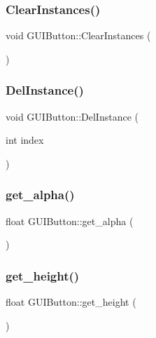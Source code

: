 \hypertarget{class_g_u_i_button_ad0f6147ba79ce14840ed061e25ca7e40}{}\label{class_g_u_i_button_ad0f6147ba79ce14840ed061e25ca7e40} 
\subsubsection{\texorpdfstring{Clear\+Instances()}{ClearInstances()}}
{\footnotesize\ttfamily void G\+U\+I\+Button\+::\+Clear\+Instances (\begin{DoxyParamCaption}{ }\end{DoxyParamCaption})}

\hypertarget{class_g_u_i_button_a8a59c9135d1533ce03f1c56c2240725f}{}\label{class_g_u_i_button_a8a59c9135d1533ce03f1c56c2240725f} 
\subsubsection{\texorpdfstring{Del\+Instance()}{DelInstance()}}
{\footnotesize\ttfamily void G\+U\+I\+Button\+::\+Del\+Instance (\begin{DoxyParamCaption}\item[{int}]{index }\end{DoxyParamCaption})}

\hypertarget{class_g_u_i_button_a9c3c65fb8afee7e4da6283d27791f694}{}\label{class_g_u_i_button_a9c3c65fb8afee7e4da6283d27791f694} 
\subsubsection{\texorpdfstring{get\+\_\+alpha()}{get\_alpha()}}
{\footnotesize\ttfamily float G\+U\+I\+Button\+::get\+\_\+alpha (\begin{DoxyParamCaption}{ }\end{DoxyParamCaption})}

\hypertarget{class_g_u_i_button_adac5dce6f892ee3df284ffd1df26b7f2}{}\label{class_g_u_i_button_adac5dce6f892ee3df284ffd1df26b7f2} 
\subsubsection{\texorpdfstring{get\+\_\+height()}{get\_height()}}
{\footnotesize\ttfamily float G\+U\+I\+Button\+::get\+\_\+height (\begin{DoxyParamCaption}{ }\end{DoxyParamCaption})}

